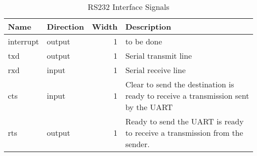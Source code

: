 \begin{table}[H]
  \centering
  \begin{tabular}{|l|l|r|p{9.5cm}|}
    
    \hline
    \rowcolor{iob-green}
    {\bf Name} & {\bf Direction} & {\bf Width} & {\bf Description}  \\ \hline \hline

    interrupt & output & 1 & to be done \\ \hline
    \rowcolor{iob-blue}
    txd & output & 1 & Serial transmit line \\ \hline
    rxd & input & 1 & Serial receive line \\ \hline
    \rowcolor{iob-blue}
    cts & input & 1 & Clear to send the destination is ready to receive a transmission sent by the UART \\ \hline
    rts & output & 1 & Ready to send the UART is ready to receive a transmission from the sender. \\ \hline
 
  \end{tabular}
  \caption{RS232 Interface Signals}
  \label{rs232_is_tab:is}
\end{table}



%
